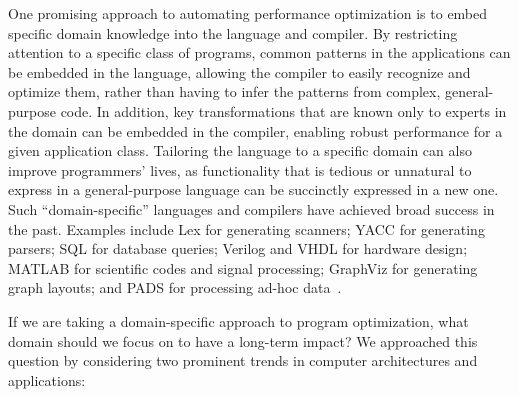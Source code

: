 One promising approach to automating performance optimization is to
embed specific domain knowledge into the language and compiler.  By
restricting attention to a specific class of programs, common patterns
in the applications can be embedded in the language, allowing the
compiler to easily recognize and optimize them, rather than having to
infer the patterns from complex, general-purpose code.  In addition,
key transformations that are known only to experts in the domain can
be embedded in the compiler, enabling robust performance for a given
application class.  Tailoring the language to a specific domain can
also improve programmers' lives, as functionality that is tedious or
unnatural to express in a general-purpose language can be succinctly
expressed in a new one.  Such ``domain-specific'' languages and
compilers have achieved broad success in the past.  Examples include
Lex for generating scanners; YACC for generating parsers; SQL for
database queries; Verilog and VHDL for hardware design; MATLAB for
scientific codes and signal processing; GraphViz for generating graph
layouts; and PADS for processing ad-hoc
data~\cite{fisher_pads:domain-specific_2005}.


If we are taking a domain-specific approach to program optimization,
what domain should we focus on to have a long-term impact?  We
approached this question by considering two prominent trends in
computer architectures and applications:

